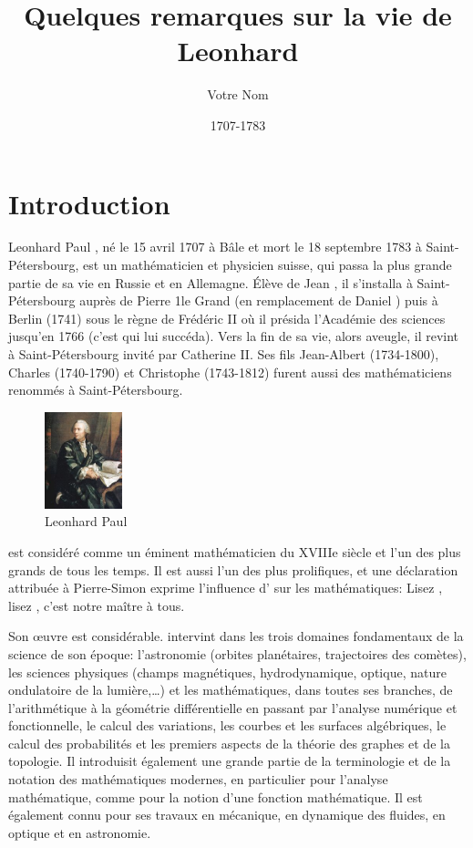 \documentclass[a4paper,11pt]{article}
\title{Quelques remarques sur la vie de Leonhard \euler}
\author{Votre Nom}
\date{1707-1783}
\theoremstyle{plain}
\theoremstyle{definition}
\theoremstyle{remark}
\newcommand{\nom}[1]{\bsc{#1}\xspace}%
\newcommand{\euler}{\nom{Euler}}
\begin{document}
\maketitle
\tableofcontents

\section*{Introduction}
Leonhard Paul \euler, né le 15 avril 1707 à Bâle et mort le 18 septembre 1783 à Saint-Pétersbourg, est un mathématicien et physicien suisse, qui passa la plus grande partie de sa vie en Russie et en Allemagne. Élève de Jean , il s'installa à Saint-Pétersbourg auprès de Pierre 1\ier le Grand (en remplacement de Daniel ) puis à Berlin (1741) sous le règne de Frédéric II où il présida l'Académie des sciences jusqu'en 1766 (c'est  qui lui succéda). Vers la fin de sa vie, alors aveugle, il revint à Saint-Pétersbourg invité par Catherine II. Ses fils Jean-Albert (1734-1800), Charles (1740-1790) et Christophe (1743-1812) furent aussi des mathématiciens renommés à Saint-Pétersbourg.

\begin{figure}
\centering
\includegraphics[width=0.2\textwidth]{euler}
\caption{Leonhard Paul \euler}
\end{figure}

\euler est considéré comme un éminent mathématicien du XVIIIe siècle et l'un des plus grands de tous les temps. 
Il est aussi l'un des plus prolifiques, et une déclaration attribuée à Pierre-Simon  exprime l'influence d'\euler sur les mathématiques: \og Lisez \euler, lisez \euler, c'est notre maître à tous\fg{}.

Son \oe uvre est considérable. \euler intervint dans les trois domaines fondamentaux de la science de son époque: l'astronomie (orbites planétaires, trajectoires des comètes), les sciences physiques (champs magnétiques, hydrodynamique, optique, nature ondulatoire de la lumière,\dots) et les mathématiques, dans toutes ses branches, de l'arithmétique à la géométrie différentielle en passant par l'analyse numérique et fonctionnelle, le calcul des variations, les courbes et les surfaces algébriques, le calcul des probabilités et les premiers aspects de la théorie des graphes et de la topologie. 
Il introduisit également une grande partie de la terminologie et de la notation des mathématiques modernes, en particulier pour l'analyse mathématique, comme pour la notion d'une fonction mathématique. 
Il est également connu pour ses travaux en mécanique, en dynamique des fluides, en optique et en astronomie.
\end{document}
